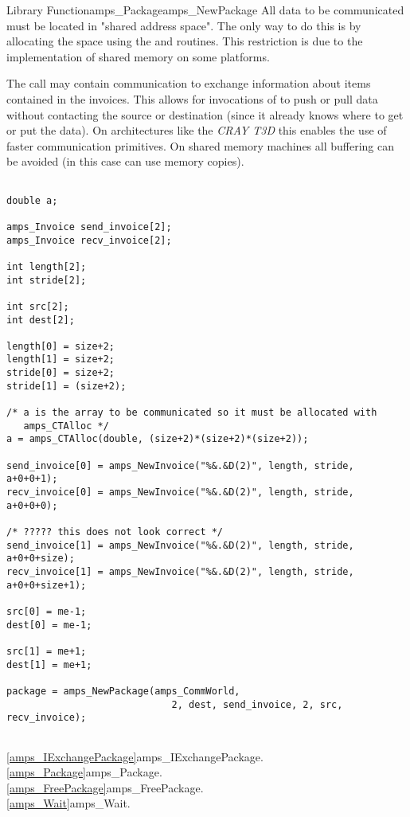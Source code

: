 \begin{deftypefn}{Library Function}{amps_Package}{amps\_NewPackage}
All data to be communicated must be located in "shared address space".
The only way to do this is by allocating the space using the
 and  routines.  This restriction
is due to the implementation of shared memory on some platforms. 

The  call may contain communication to exchange
information about items contained in the invoices.  This allows for
invocations of  to push or pull data without
contacting the source or destination (since it already knows where to
get or put the data).  On architectures like the {\em CRAY T3D} this enables
the use of faster communication primitives.  On shared memory machines
all buffering can be avoided (in this case 
can use memory copies).

\begin{display}\begin{verbatim}

double a;

amps_Invoice send_invoice[2];
amps_Invoice recv_invoice[2];

int length[2];
int stride[2];
 
int src[2];
int dest[2];

length[0] = size+2;
length[1] = size+2;
stride[0] = size+2;
stride[1] = (size+2);

/* a is the array to be communicated so it must be allocated with 
   amps_CTAlloc */ 
a = amps_CTAlloc(double, (size+2)*(size+2)*(size+2));

send_invoice[0] = amps_NewInvoice("%&.&D(2)", length, stride, a+0+0+1);
recv_invoice[0] = amps_NewInvoice("%&.&D(2)", length, stride, a+0+0+0);

/* ????? this does not look correct */      
send_invoice[1] = amps_NewInvoice("%&.&D(2)", length, stride, a+0+0+size);
recv_invoice[1] = amps_NewInvoice("%&.&D(2)", length, stride, a+0+0+size+1);
      
src[0] = me-1;
dest[0] = me-1;
      
src[1] = me+1;
dest[1] = me+1;
      
package = amps_NewPackage(amps_CommWorld,
                             2, dest, send_invoice, 2, src, recv_invoice);
 
\end{verbatim}\end{display}

\SEEALSO
\vref{amps_IExchangePackage}{amps\_IExchangePackage}. \\
\vref{amps_Package}{amps\_Package}. \\
\vref{amps_FreePackage}{amps\_FreePackage}. \\
\vref{amps_Wait}{amps\_Wait}. \\

\end{deftypefn}

